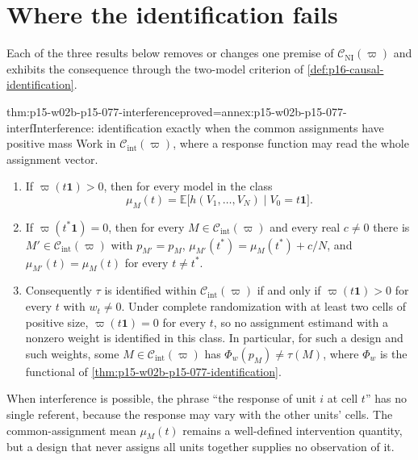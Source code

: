 \section{Where the identification fails}
\label{sec:p15-w02b-p15-077-boundaries}

Each of the three results below removes or changes one premise of
\(\mathcal C_{\mathrm{NI}}(\varpi)\) and exhibits the consequence through
the two-model criterion of \cref{def:p16-causal-identification}.

\begin{hbtheorem}{thm:p15-w02b-p15-077-interference}{proved=annex:p15-w02b-p15-077-interf}{Interference: identification exactly when the common assignments have positive mass}
Work in \(\mathcal C_{\mathrm{int}}(\varpi)\), where a response function
may read the whole assignment vector.
\begin{enumerate}
\item If \(\varpi(t\mathbf 1)>0\), then for every model in the class
      \[
       \mu_M(t)=\mathbb E\bigl[h(V_1,\ldots,V_N)\mid V_0=t\mathbf 1\bigr].
      \]
\item If \(\varpi(t^*\mathbf 1)=0\), then for every
      \(M\in\mathcal C_{\mathrm{int}}(\varpi)\) and every real
      \(c\ne0\) there is \(M'\in\mathcal C_{\mathrm{int}}(\varpi)\)
      with \(p_{M'}=p_M\), \(\mu_{M'}(t^*)=\mu_M(t^*)+c/N\), and
      \(\mu_{M'}(t)=\mu_M(t)\) for every \(t\ne t^*\).
\item Consequently \(\tau\) is identified within
      \(\mathcal C_{\mathrm{int}}(\varpi)\) if and only if
      \(\varpi(t\mathbf 1)>0\) for every \(t\) with \(w_t\ne0\).
      Under complete randomization with at least two cells of positive
      size, \(\varpi(t\mathbf 1)=0\) for every \(t\), so no assignment
      estimand with a nonzero weight is identified in this class. In
      particular, for such a design and such weights, some
      \(M\in\mathcal C_{\mathrm{int}}(\varpi)\) has
      \(\Phi_w(p_M)\ne\tau(M)\), where \(\Phi_w\) is the functional
      of \cref{thm:p15-w02b-p15-077-identification}.
\end{enumerate}
\end{hbtheorem}

When interference is possible, the phrase ``the response of unit \(i\) at
cell \(t\)'' has no single referent, because the response may vary with
the other units' cells. The common-assignment mean \(\mu_M(t)\) remains a
well-defined intervention quantity, but a design that never assigns all
units together supplies no observation of it.


